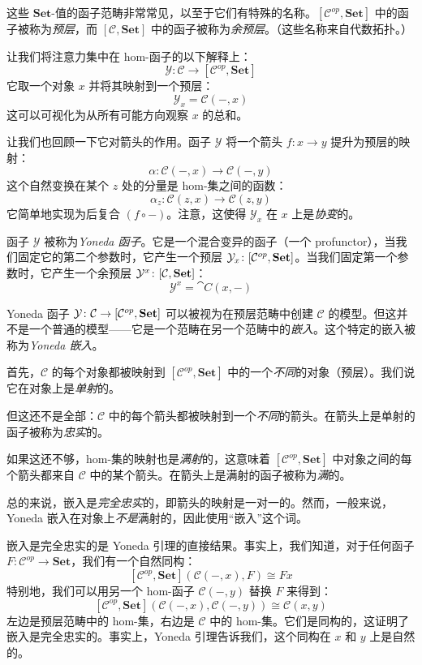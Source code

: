 \documentclass[DaoFP]{subfiles}
\begin{document}
这些 $\mathbf{Set}$-值的函子范畴非常常见，以至于它们有特殊的名称。$[\mathcal{C}^{op},  \mathbf{Set}]$ 中的函子被称为\emph{预层}，而 $[\mathcal{C},  \mathbf{Set}]$ 中的函子被称为\emph{余预层}。（这些名称来自代数拓扑。）

让我们将注意力集中在 hom-函子的以下解释上：
\[ \mathcal{Y} \colon \mathcal{C} \to [\mathcal{C}^{op},  \mathbf{Set}] \]
它取一个对象 $x$ 并将其映射到一个预层：
\[ \mathcal Y_x = \mathcal{C}(-, x) \]
这可以可视化为从所有可能方向观察 $x$ 的总和。

让我们也回顾一下它对箭头的作用。函子 $\mathcal{Y}$ 将一个箭头 $f \colon x \to y$ 提升为预层的映射：
\[ \alpha \colon \mathcal{C}(-, x) \to \mathcal{C}(-, y) \]
这个自然变换在某个 $z$ 处的分量是 hom-集之间的函数：
\[ \alpha_z \colon \mathcal{C}(z, x) \to \mathcal{C}(z, y) \]
它简单地实现为后复合 $(f \circ -)$。注意，这使得 $ \mathcal Y_x$ 在 $x$ 上是\emph{协变}的。

函子 $\mathcal{Y}$ 被称为\emph{Yoneda 函子}。它是一个混合变异的函子（一个 profunctor），当我们固定它的第二个参数时，它产生一个预层 $\mathcal{Y}_x \colon [\mathcal{C}^{op}, \mathbf{Set}]$。当我们固定第一个参数时，它产生一个余预层 $\mathcal{Y}^x \colon [\mathcal{C}, \mathbf{Set}]$：
\[ \mathcal{Y}^x  = \cat C(x, -) \]

Yoneda 函子 $\mathcal{Y} \colon \mathcal{C} \to [\mathcal{C}^{op}, \mathbf{Set}]$ 可以被视为在预层范畴中创建 $\mathcal{C}$ 的模型。但这并不是一个普通的模型——它是一个范畴在另一个范畴中的\emph{嵌入}。这个特定的嵌入被称为\emph{Yoneda 嵌入}。

首先，$\mathcal{C}$ 的每个对象都被映射到 $[\mathcal{C}^{op},  \mathbf{Set}]$ 中的一个\emph{不同}的对象（预层）。我们说它在对象上是\emph{单射}的。

但这还不是全部：$\mathcal{C}$ 中的每个箭头都被映射到一个\emph{不同}的箭头。在箭头上是单射的函子被称为\emph{忠实}的。

如果这还不够，hom-集的映射也是\emph{满射}的，这意味着 $[\mathcal{C}^{op},  \mathbf{Set}]$ 中对象之间的每个箭头都来自 $\mathcal{C}$ 中的某个箭头。在箭头上是满射的函子被称为\emph{满}的。

总的来说，嵌入是\emph{完全忠实}的，即箭头的映射是一对一的。然而，一般来说，Yoneda 嵌入在对象上\emph{不是}满射的，因此使用“嵌入”这个词。

嵌入是完全忠实的是 Yoneda 引理的直接结果。事实上，我们知道，对于任何函子 $F \colon \mathcal{C}^{op} \to \mathbf{Set}$，我们有一个自然同构：
\[ [\mathcal{C}^{op}, \mathbf{Set}]( \mathcal{C}(-, x), F) \cong F x \]
特别地，我们可以用另一个 hom-函子 $\mathcal{C}(-, y)$ 替换 $F$ 来得到：
\[ [\mathcal{C}^{op}, \mathbf{Set}]( \mathcal{C}(-, x), \mathcal{C}(-, y)) \cong \mathcal{C}(x, y)\]
左边是预层范畴中的 hom-集，右边是 $\mathcal{C}$ 中的 hom-集。它们是同构的，这证明了嵌入是完全忠实的。事实上，Yoneda 引理告诉我们，这个同构在 $x$ 和 $y$ 上是自然的。
\end{document}
